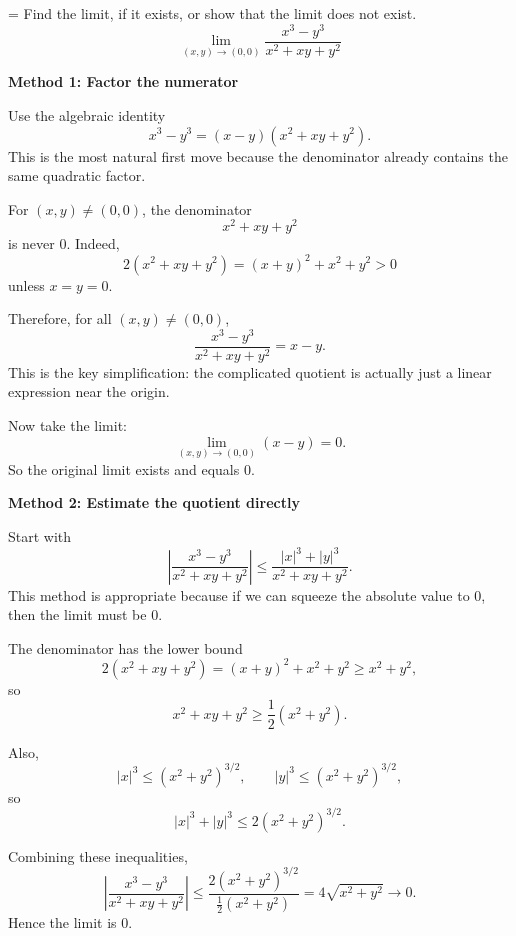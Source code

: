 \documentclass[a4paper,12pt,twocolumn]{article}
\newlength{\problemnumberwidth}
\newenvironment{solutionbox}{\begin{framed}}{\end{framed}}
\newcommand{\problem}[3]{%
  \Needspace{10\baselineskip}%
  \phantomsection\label{#1}%
  \par\vspace{0.8em}%
  \noindent
  \hangindent=\problemnumberwidth
  \hangafter=1
  \makebox[\problemnumberwidth][l]{\textbf{#2.}}#3\par
}
\begin{document}
\problem{prob:14-2-24}{24}{Find the limit, if it exists, or show that the limit does not exist.
\[
\lim_{(x,y)\to(0,0)} \frac{x^3-y^3}{x^2+xy+y^2}
\]}

\begin{solutionbox}
\textbf{Method 1: Factor the numerator}

\begin{steps}
\item Use the algebraic identity
\[
x^3-y^3=(x-y)(x^2+xy+y^2).
\]
This is the most natural first move because the denominator already contains the same quadratic factor.

\item For \((x,y)\ne(0,0)\), the denominator
\[
x^2+xy+y^2
\]
is never \(0\). Indeed,
\[
2(x^2+xy+y^2)=(x+y)^2+x^2+y^2>0
\]
unless \(x=y=0\).

\item Therefore, for all \((x,y)\ne(0,0)\),
\[
\frac{x^3-y^3}{x^2+xy+y^2}=x-y.
\]
This is the key simplification: the complicated quotient is actually just a linear expression near the origin.

\item Now take the limit:
\[
\lim_{(x,y)\to(0,0)}(x-y)=0.
\]
So the original limit exists and equals \(0\).
\end{steps}
\end{solutionbox}

\begin{solutionbox}
\textbf{Method 2: Estimate the quotient directly}

\begin{steps}
\item Start with
\[
\left|\frac{x^3-y^3}{x^2+xy+y^2}\right|
\le
\frac{|x|^3+|y|^3}{x^2+xy+y^2}.
\]
This method is appropriate because if we can squeeze the absolute value to \(0\), then the limit must be \(0\).

\item The denominator has the lower bound
\[
2(x^2+xy+y^2)=(x+y)^2+x^2+y^2\ge x^2+y^2,
\]
so
\[
x^2+xy+y^2\ge \frac12(x^2+y^2).
\]

\item Also,
\[
|x|^3\le (x^2+y^2)^{3/2},
\qquad
|y|^3\le (x^2+y^2)^{3/2},
\]
so
\[
|x|^3+|y|^3\le 2(x^2+y^2)^{3/2}.
\]

\item Combining these inequalities,
\[
\left|\frac{x^3-y^3}{x^2+xy+y^2}\right|
\le
\frac{2(x^2+y^2)^{3/2}}{\frac12(x^2+y^2)}
=4\sqrt{x^2+y^2}\to 0.
\]
Hence the limit is \(0\).
\end{steps}
\end{solutionbox}
\end{document}

